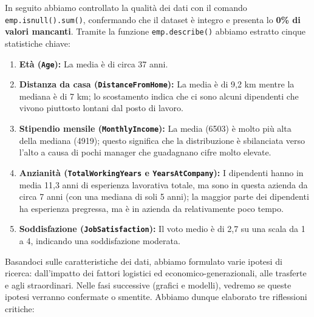 \documentclass{article}
\begin{document}
\noindent In seguito abbiamo controllato la qualità dei dati con il comando \texttt{emp.isnull().sum()}, confermando che il dataset è integro e presenta lo \textbf{0\% di valori mancanti}. Tramite la funzione \texttt{emp.describe()} abbiamo estratto cinque statistiche chiave:
\begin{enumerate}
    \item \textbf{Età (\texttt{Age}):} La media è di circa 37 anni.
    \item \textbf{Distanza da casa (\texttt{DistanceFromHome}):} La media è di 9,2 km mentre la mediana è di 7 km; lo scostamento indica che ci sono alcuni dipendenti che vivono piuttosto lontani dal posto di lavoro.
    \item \textbf{Stipendio mensile (\texttt{MonthlyIncome}):} La media (6503) è molto più alta della mediana (4919); questo significa che la distribuzione è sbilanciata verso l'alto a causa di pochi manager che guadagnano cifre molto elevate.
    \item \textbf{Anzianità (\texttt{TotalWorkingYears} e \texttt{YearsAtCompany}):} I dipendenti hanno in media 11,3 anni di esperienza lavorativa totale, ma sono in questa azienda da circa 7 anni (con una mediana di soli 5 anni); la maggior parte dei dipendenti ha esperienza pregressa, ma è in azienda da relativamente poco tempo.
    \item \textbf{Soddisfazione (\texttt{JobSatisfaction}):} Il voto medio è di 2,7 su una scala da 1 a 4, indicando una soddisfazione moderata.
\end{enumerate}

\noindent Basandoci sulle caratteristiche dei dati, abbiamo formulato varie ipotesi di ricerca: dall’impatto dei fattori logistici ed economico-generazionali, alle trasferte e agli straordinari. Nelle fasi successive (grafici e modelli), vedremo se queste ipotesi verranno confermate o smentite. Abbiamo dunque elaborato tre riflessioni critiche:
\end{document}
